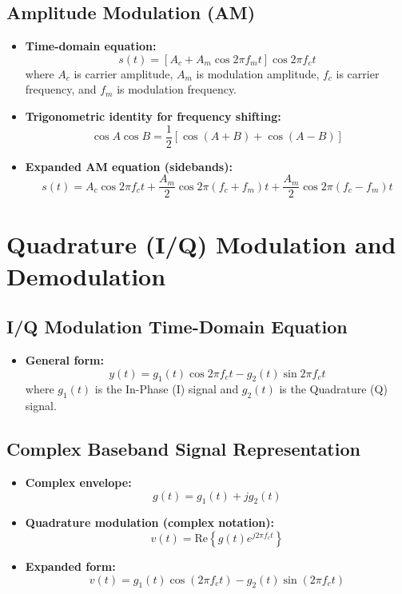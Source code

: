 \documentclass{article}
\begin{document}
\subsection*{Amplitude Modulation (AM)}
\begin{itemize}
    \item \textbf{Time-domain equation:}
    \[
    s(t) = \left[A_c + A_m \cos 2\pi f_m t\right] \cos 2\pi f_c t
    \]
    where $A_c$ is carrier amplitude, $A_m$ is modulation amplitude, $f_c$ is carrier frequency, and $f_m$ is modulation frequency.
    \item \textbf{Trigonometric identity for frequency shifting:} 
    \[
    \cos A \cos B = \frac{1}{2}[\cos(A + B) + \cos(A - B)]
    \]
    \item \textbf{Expanded AM equation (sidebands):}
    \[
    s(t) = A_c \cos 2\pi f_c t + \frac{A_m}{2} \cos 2\pi(f_c + f_m)t + \frac{A_m}{2} \cos 2\pi(f_c - f_m)t
    \]
\end{itemize}

\newpage
\section{Quadrature (I/Q) Modulation and Demodulation}

\subsection*{I/Q Modulation Time-Domain Equation}
\begin{itemize}
    \item \textbf{General form:}
    \[
    y(t) = g_1(t) \cos 2\pi f_c t - g_2(t) \sin 2\pi f_c t
    \]
    where $g_1(t)$ is the In-Phase (I) signal and $g_2(t)$ is the Quadrature (Q) signal.
\end{itemize}

\subsection*{Complex Baseband Signal Representation}
\begin{itemize}
    \item \textbf{Complex envelope:}
    \[
    g(t) = g_1(t) + j g_2(t)
    \]
    \item \textbf{Quadrature modulation (complex notation):}
    \[
    v(t) = \text{Re}\left\{g(t) e^{j2\pi f_c t}\right\}
    \]
    \item \textbf{Expanded form:}
    \[
    v(t) = g_1(t) \cos(2\pi f_c t) - g_2(t) \sin(2\pi f_c t)
    \]
\end{itemize}
\end{document}
